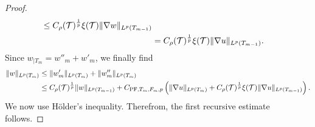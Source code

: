 \documentclass[10pt,a4paper]{article}
\begin{document}
\begin{proof}
\begin{align*}
        \leq 
        C_\rho({\mathcal T})^{\frac 1 p} \xi({\mathcal T})
        \| \nabla w \|_{L^{p}(T_{m-1})}
        \\&
        =
        C_\rho({\mathcal T})^{\frac 1 p} \xi({\mathcal T})
        \| \nabla u \|_{L^{p}(T_{m-1})}
        .
    \end{align*}
    Since $w_{|T_{m}} = w''_{m} + w'_{m}$, we finally find 
    \begin{align*}
        \| w \|_{L^{p}(T_{m})}
        &
        \leq  
        \| w'_{m} \|_{L^{p}(T_{m})}
        + 
        \| w''_{m} \|_{L^{p}(T_{m})}
        \\&
        \leq  
        C_\rho({\mathcal T})^{\frac 1 p} 
        \| w \|_{L^{p}(T_{m-1})} 
        + 
        C_{{\rm PF},T_{m},F_{m},p} 
        \left( 
            \| \nabla u \|_{L^{p}(T_{m})} 
            + 
            C_\rho({\mathcal T})^{\frac 1 p} \xi({\mathcal T})
        \| \nabla u \|_{L^{p}(T_{m-1})}
        \right). 
    \end{align*}
    We now use H\"older's inequality. 
    Therefrom, the first recursive estimate follows.
    

\end{proof}
\end{document}
